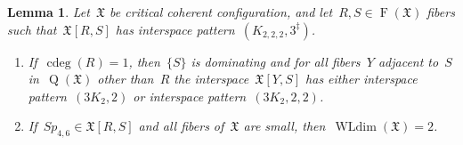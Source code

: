 \documentclass[english,a4paper]{article}
\theoremstyle{plain}
\newtheorem{lemma}      [theorem]{Lemma}
\theoremstyle{definition}
\DeclareMathOperator{\Fibers}{F}
\newcommand{\coherentConfig}{\ensuremath{\mathfrak{X}}}
\newcommand{\fibers}[1]{\ensuremath{\Fibers \left( #1 \right)}}
\newcommand{\interspace}[2]{\ensuremath{\coherentConfig[#1,#2]}}
\DeclareMathOperator*{\WLdim}{WLdim}
\newcommand{\wldim}[1]{\ensuremath{\WLdim\left(#1\right)}}
\DeclareMathOperator*{\Quotient}{Q}
\newcommand{\quotientGraph}[1]{\ensuremath{\Quotient(#1)}}
\DeclareMathOperator{\ColorDeg}{cdeg}
\newcommand{\colorDeg}[1]{\ensuremath{\ColorDeg\left(#1\right)}}
\newcommand{\ipsixMatching}             {\ensuremath{(\disjointCliques{3}{2},2)}}
\newcommand{\ipsixMatchingTwice}        {\ensuremath{(\disjointCliques{3}{2},2,2)}}
\newcommand{\ipsixMatchingComplementD}{\ensuremath{(\clique{2,2,2},3^\ddag)}}
\newcommand{\clique}[1]{\ensuremath{K_{#1}}}
\newcommand{\disjointCliques}[2]{\ensuremath{#1 \clique{#2}}}
\newcommand{\interspaceFourSix}{\ensuremath{Sp_{4,6}}}
\begin{document}
\begin{lemma}
\label{critical:4cc-6cc/lem}
    Let~$\coherentConfig$ be critical coherent configuration, and let~$R,S \in \fibers{\coherentConfig}$ fibers such that~$\interspace{R}{S}$ has interspace pattern~$\ipsixMatchingComplementD$.
    \begin{enumerate}
        \item\label{4cc-6cc:part1}
        If~$\colorDeg{R} = 1$, then~$\{S\}$ is dominating and for all fibers~$Y$ adjacent to~$S$ in~$\quotientGraph{\coherentConfig}$ other than~$R$ the interspace~$\interspace{Y}{S}$ has either interspace pattern~$\ipsixMatching$ or interspace pattern~$\ipsixMatchingTwice$.
        \item
        If~$\interspaceFourSix \in \interspace{R}{S}$ and all fibers of~$\coherentConfig$ are small, then~$\wldim{\coherentConfig} = 2$.
    \end{enumerate}
\end{lemma}
\end{document}
